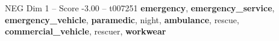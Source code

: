 \begin{textsample}{NEG Dim 1 – Score -3.00 – t007251}  \label{ex:f1_neg_025}
\textbf{emergency}, \textbf{emergency\_service}, \textbf{emergency\_vehicle}, \textbf{paramedic}, night, \textbf{ambulance}, rescue, \textbf{commercial\_vehicle}, rescuer, \textbf{workwear}

\end{textsample}
